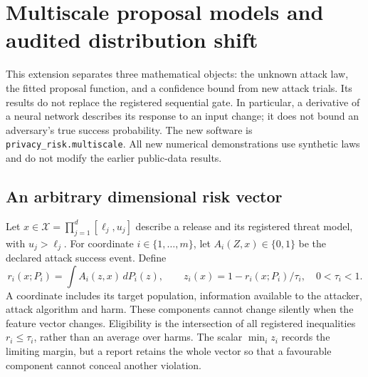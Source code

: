 \section{Multiscale proposal models and audited distribution shift}
\label{sec:multiscale-extension}
This extension separates three mathematical objects: the unknown attack law,
the fitted proposal function, and a confidence bound from new attack trials.
Its results do not replace the registered sequential gate. In particular,
a derivative of a neural network describes its response to an input change;
it does not bound an adversary's true success probability. The new software is
\texttt{privacy\_risk.multiscale}. All new numerical demonstrations use synthetic
laws and do not modify the earlier public-data results.

\subsection{An arbitrary dimensional risk vector}
Let $x\in\mathcal X=\prod_{j=1}^d[\ell_j,u_j]$ describe a release and its
registered threat model, with $u_j>\ell_j$. For coordinate $i\in\{1,\ldots,m\}$,
let $A_i(Z,x)\in\{0,1\}$ be the declared attack success event. Define
\begin{equation}
 r_i(x;P_i)=\int A_i(z,x)\,dP_i(z),\qquad
 z_i(x)=1-r_i(x;P_i)/\tau_i,\quad 0<\tau_i<1.
\end{equation}
A coordinate includes its target population, information available to the
attacker, attack algorithm and harm. These components cannot change silently
when the feature vector changes. Eligibility is the intersection of all
registered inequalities $r_i\le\tau_i$, rather than an average over harms.
The scalar $\min_i z_i$ records the limiting margin, but a report retains the
whole vector so that a favourable component cannot conceal another violation.

